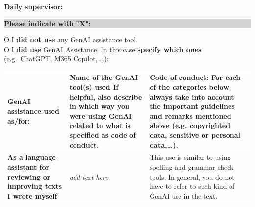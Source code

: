 \textbf{Daily supervisor:} \dotfill

\vspace{2em}

\noindent
\colorbox{lightgray}{\parbox{\dimexpr\linewidth-2\fboxsep\relax}{\textbf{Please indicate with "X":}}}

\vspace{1em}

O I \textbf{did not use} any GenAI assistance tool. \\[1em]

O I \textbf{did use} GenAI Assistance. In this case \textbf{specify which ones} (e.g.\ ChatGPT, M365 Copilot, …): \dotfill

\newpage
\begin{longtable}{|p{}|p{}|p{}|}
\hline 
\textbf{GenAI assistance used as/for:} & \textbf{Name of the GenAI tool(s) used} If helpful, also describe in which way you were using GenAI related to what is specified as code of conduct. & \textbf{Code of conduct: \newline
For each of the categories below, always take into account the important guidelines and remarks mentioned above (e.g. copyrighted data, sensitive or personal data,…).} \\ \hline
\endfirsthead


\hline
\endfoot

\hline
\endlastfoot

\textbf{As a language assistant for reviewing or improving texts I wrote myself} & \textit{add text here} & This use is similar to using spelling and grammar check tools. In general, you do not have to refer to such kind of GenAI use in the text. 


\end{longtable}

